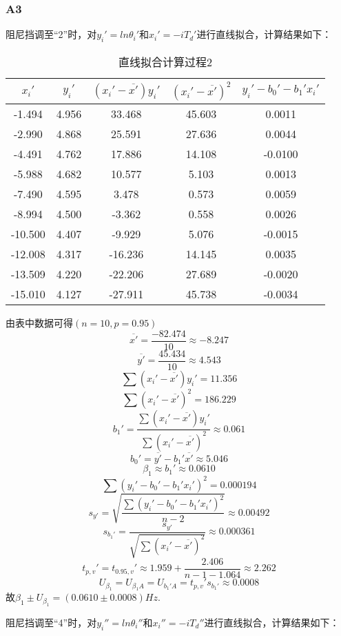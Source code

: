 \documentclass[12pt,a4paper,oneside,left=3.18,right=3.18,top=2.54,bottom=2.54]{ctexart}
\begin{document}
		\subsubsection{A3}
			阻尼挡调至“2”时，对$y_i'=ln\theta_i'$和$x_i'=-iT_d'$进行直线拟合，计算结果如下：
			\begin{table}[H]
			\centering
			\begin{tabular}{|c|c|c|c||c|}
			\hline
			$x_i'$&$y_i'$&$(x_i'-\overline{x'})y_i'$&$(x_i'-\overline{x'})^2$&$y_i'-b_0'-b_1'x_i'$\\
			\hline
			-1.494&4.956&33.468&45.603&0.0011\\
			\hline
			-2.990&4.868&25.591&27.636&0.0044\\
			\hline
			-4.491&4.762&17.886&14.108&-0.0100\\
			\hline
			-5.988&4.682&10.577&5.103&0.0013\\
			\hline
			-7.490&4.595&3.478&0.573&0.0059\\
			\hline
			-8.994&4.500&-3.362&0.558&0.0026\\
			\hline
			-10.500&4.407&-9.929&5.076&-0.0015\\
			\hline
			-12.008&4.317&-16.236&14.145&0.0035\\
			\hline
			-13.509&4.220&-22.206&27.689&-0.0020\\
			\hline
			-15.010&4.127&-27.911&45.738&-0.0034\\
			\hline
			\end{tabular}
			\caption{直线拟合计算过程2}
			\end{table}
			由表中数据可得$(n=10,p=0.95)$
			$$\overline{x'}=\dfrac{-82.474}{10}\approx-8.247$$
			$$\overline{y'}=\dfrac{45.434}{10}\approx4.543$$
			$$\sum{(x_i'-\overline{x'})y_i'}=11.356$$
			$$\sum{(x_i'-\overline{x'})^2}=186.229$$
			$$b_1'=\dfrac{\sum{(x_i'-\overline{x'})y_i'}}{\sum{(x_i'-\overline{x'})^2}}\approx0.061$$
			$$b_0'=\overline{y'}-b_1'\overline{x'}\approx5.046$$
			$$\beta_1\approx b_1'\approx0.0610$$
			$$\sum{(y_i'-b_0'-b_1'x_i')^2}=0.000194$$
			$$s_{y'}=\sqrt{\dfrac{\sum{(y_i'-b_0'-b_1'x_i')^2}}{n-2}}\approx0.00492$$
			$$s_{b_1'}=\dfrac{s_{y'}}{\sqrt{\sum{(x_i'-\overline{x'})^2}}}\approx0.000361$$
			$$t_{p,v}'=t_{0.95,v}'\approx1.959+\dfrac{2.406}{n-1-1.064}\approx2.262$$
			$$U_{\beta_1}=U_{\beta_1A}=U_{b_1'A}=t_{p,v}'s_{b_1'}\approx0.0008$$
			故$\beta_1\pm U_{\beta_1}=(0.0610\pm0.0008)Hz$.\par
			阻尼挡调至“4”时，对$y_i''=ln\theta_i''$和$x_i''=-iT_d''$进行直线拟合，计算结果如下：
\end{document}
